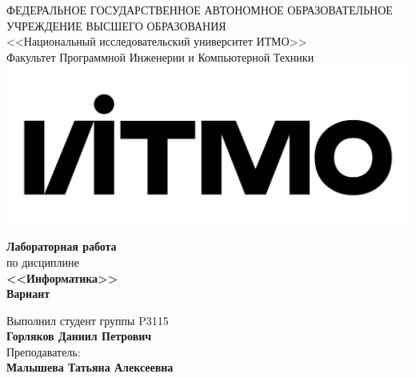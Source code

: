 \begin{titlepage}
\thispagestyle{firststyle}
\begin{center}
    ФЕДЕРАЛЬНОЕ ГОСУДАРСТВЕННОЕ АВТОНОМНОЕ ОБРАЗОВАТЕЛЬНОЕ УЧРЕЖДЕНИЕ ВЫСШЕГО ОБРАЗОВАНИЯ\\
    \vspace{0.5cm}
<<Национальный исследовательский университет ИТМО>>\\
Факультет Программной Инженерии и Компьютерной Техники \\
\vspace{1cm}
    \includegraphics[scale=0.1]{img/itmo_logo.png}
\end{center}

\vspace{1cm}

\begin{center}
    \large
    \textbf{Лабораторная работа }\\
    по дисциплине\\
    \textbf{<<Информатика>>} \\
     \textbf{Вариант }
\end{center}

\vspace{2cm}

\begin{center}
  Выполнил студент  группы P3115\\
  \textbf{Горляков Даниил Петрович} \\
  Преподаватель: \\
  \textbf{Малышева Татьяна Алексеевна}\\
\end{center}

\end{titlepage}